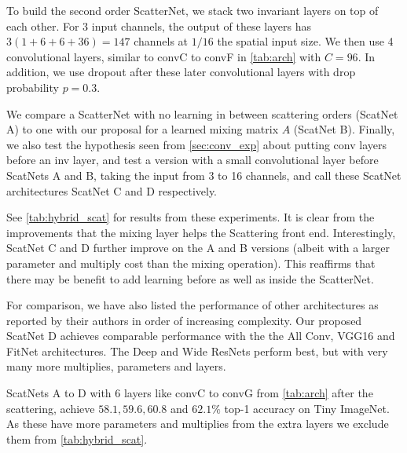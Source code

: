 To build the second order ScatterNet, we stack two invariant layers on top of each
other. For 3 input channels, the output of these layers has $3(1 +
6 + 6 +36) = 147$ channels at $1/16$ the spatial input size. We then use 4
convolutional layers, similar to convC to convF in \autoref{tab:arch} with
$C=96$. In addition, we use dropout after these later convolutional layers with drop probability $p=0.3$.

We compare a ScatterNet with no learning in between scattering orders
(ScatNet A) to one with our proposal for a learned mixing matrix $A$ (ScatNet B). Finally,
we also test the hypothesis seen from \autoref{sec:conv_exp} about putting conv
layers before an inv layer, and test a version with a small convolutional layer
before ScatNets A and B, taking the input from 3 to 16 channels, and call these ScatNet
architectures ScatNet C and D respectively.

See \autoref{tab:hybrid_scat} for results from these experiments. It is clear from
the improvements that the mixing layer helps the Scattering front end.
Interestingly, ScatNet C and D further improve on the A and B versions
(albeit with a larger parameter and multiply cost than the mixing operation). This reaffirms that there
may be benefit to add learning before as well as inside the ScatterNet.

For comparison, we have also listed the performance of other architectures as
reported by their authors in order of increasing complexity. Our proposed ScatNet D achieves
comparable performance with the the All Conv, VGG16 and FitNet architectures.
The Deep\cite{he_identity_2016} and Wide\cite{zagoruyko_wide_2016}
ResNets perform best, but with very many more
multiplies, parameters and layers.

ScatNets A to D with 6 layers like convC to convG from \autoref{tab:arch} after
the scattering, achieve $58.1, 59.6, 60.8$ and $62.1\%$ top-1 accuracy on Tiny ImageNet. As
these have more parameters and multiplies from the extra layers we exclude them
from \autoref{tab:hybrid_scat}.


